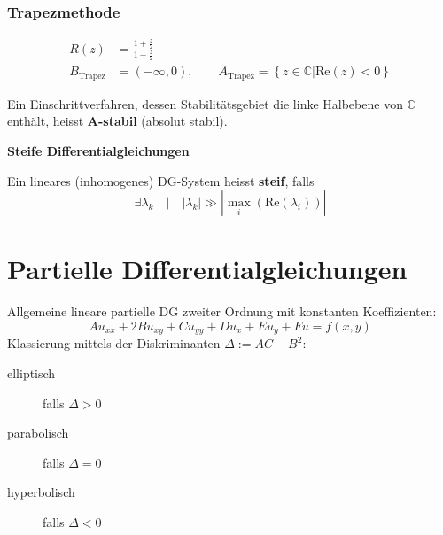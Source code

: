 		\subsubsection{Trapezmethode}
			\begin{align*}
				R(z) &= \frac{1+\frac{z}{2}}{1-\frac{z}{2}} \\
				B_\text{Trapez} &= (-\infty,0), \qquad A_\text{Trapez} = \left\{ z \in \mathbb{C} \big\vert \text{Re}(z) <0\right\}
			\end{align*}

			Ein Einschrittverfahren, dessen Stabilitätsgebiet die linke Halbebene von $\mathbb{C}$ enthält, heisst \textbf{A-stabil} (absolut stabil). 
			
			\vspace{5pt}
			\begin{definition}
				\textbf{Steife Differentialgleichungen}
				
				Ein lineares (inhomogenes) DG-System heisst \textbf{steif}, falls
				\[
					\exists \lambda_k\quad \big\vert\quad|\lambda_k| \gg |\max_i(\text{Re}(\lambda_i))|
				\]
			\end{definition}
			
\section{Partielle Differentialgleichungen}
	Allgemeine lineare partielle DG zweiter Ordnung mit konstanten Koeffizienten: 
	\[
		A u_{xx} + 2Bu_{xy} + Cu_{yy}+ Du_x+ E u_y + Fu= f(x,y) 
	\]
	Klassierung mittels der Diskriminanten $\Delta := AC-B^2$: 
	\begin{description}
		\item[elliptisch]   falls $\Delta > 0$
		\item[parabolisch]  falls $\Delta = 0$
		\item[hyperbolisch] falls $\Delta < 0$
	\end{description}

